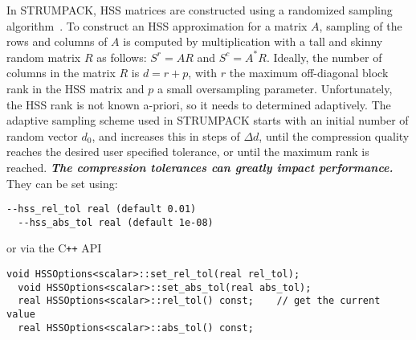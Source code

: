 \documentclass{article}
\begin{document}
In STRUMPACK, HSS matrices are constructed using a randomized sampling
algorithm~\cite{martinsson2011fast}. To construct an HSS approximation
for a matrix $A$, sampling of the rows and columns of $A$ is computed
by multiplication with a tall and skinny random matrix $R$ as follows:
$S^r = A R$ and $S^c = A^* R$. Ideally, the number of columns in the
matrix $R$ is $d = r + p$, with $r$ the maximum off-diagonal block
rank in the HSS matrix and $p$ a small oversampling
parameter. Unfortunately, the HSS rank is not known a-priori, so it
needs to determined adaptively. The adaptive sampling scheme used in
STRUMPACK starts with an initial number of random vector $d_0$, and
increases this in steps of $\Delta d$, until the compression quality
reaches the desired user specified tolerance, or until the maximum
rank is reached. \emph{\textbf{The compression tolerances can greatly
    impact performance.}} They can be set using:
\begin{lstlisting}[style=Bash]
  --hss_rel_tol real (default 0.01)
  --hss_abs_tol real (default 1e-08)
\end{lstlisting}
or via the C\texttt{++} API
\begin{lstlisting}[style=C]
  void HSSOptions<scalar>::set_rel_tol(real rel_tol);
  void HSSOptions<scalar>::set_abs_tol(real abs_tol);
  real HSSOptions<scalar>::rel_tol() const;    // get the current value
  real HSSOptions<scalar>::abs_tol() const;
\end{lstlisting}
\end{document}
